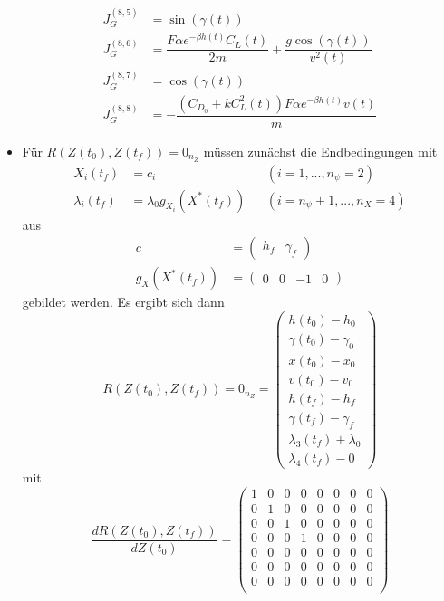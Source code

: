 \begin{itemize}
\begin{align}
J_G^{(8,5)} &= \sin(\gamma(t)) \\
J_G^{(8,6)} &= \dfrac{F \alpha e^{-\beta h(t)} C_L(t)}{2m} + \dfrac{g \cos(\gamma(t))}{v^2(t)} \\
J_G^{(8,7)} &= \cos(\gamma(t)) \\
J_G^{(8,8)} &= - \dfrac{(C_{D_0} + k C_L^2(t)) F \alpha e^{-\beta h(t)} v(t)}{m} 
\end{align}
%
\item Für $R(Z(t_0),Z(t_f)) = 0_{n_Z}$ müssen zunächst die Endbedingungen mit
\begin{align*}
X_i(t_f) &= c_i & & (i=1,...,n_{\psi}=2) \\
\lambda_i(t_f) &= \lambda_0 g_{X_i}(X^{\ast}(t_f)) & &(i=n_{\psi}+1,...,n_X=4)
\end{align*}
aus
\begin{align*}
c &= \begin{pmatrix} h_f & \gamma_f \end{pmatrix} \\
g_{X}(X^{\ast}(t_f)) &= \begin{pmatrix} 0 & 0 & -1 & 0 \end{pmatrix}
\end{align*}
gebildet werden. Es ergibt sich dann
\begin{equation}
R(Z(t_0),Z(t_f)) = 0_{n_Z} = \begin{pmatrix}
h(t_0) - h_0 \\ 
\gamma(t_0) - \gamma_0 \\
x(t_0) - x_0 \\ 
v(t_0) - v_0 \\ 
h(t_f) - h_f \\ 
\gamma(t_f) - \gamma_f \\
\lambda_3(t_f) + \lambda_0 \\ 
\lambda_4(t_f) - 0
\end{pmatrix}
\end{equation}
mit 
\begin{equation}
\dfrac{d R(Z(t_0),Z(t_f))}{d Z(t_0)} = \begin{pmatrix}
1 & 0 & 0 & 0 & 0 & 0 & 0 & 0 \\ 
0 & 1 & 0 & 0 & 0 & 0 & 0 & 0 \\ 
0 & 0 & 1 & 0 & 0 & 0 & 0 & 0 \\ 
0 & 0 & 0 & 1 & 0 & 0 & 0 & 0 \\
0 & 0 & 0 & 0 & 0 & 0 & 0 & 0 \\
0 & 0 & 0 & 0 & 0 & 0 & 0 & 0 \\
0 & 0 & 0 & 0 & 0 & 0 & 0 & 0 \\

\end{pmatrix}
\end{equation}
\end{itemize}
